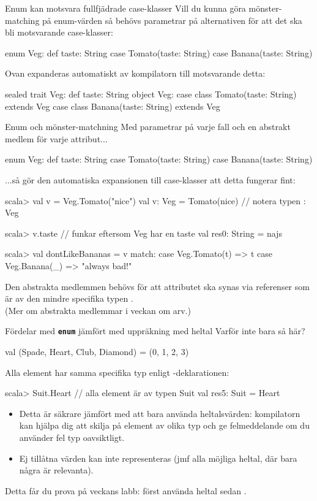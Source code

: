 \begin{Slide}{Enum kan motsvara fullfjädrade case-klasser}
Vill du kunna göra mönster-matching på enum-värden så behövs parametrar på alternativen för att det ska bli motsvarande case-klasser: 
\begin{Code}
enum Veg:
  def taste: String
  case Tomato(taste: String)
  case Banana(taste: String)
\end{Code}
Ovan expanderas automatiskt av kompilatorn till motsvarande detta:
\begin{Code}
sealed trait Veg:
  def taste: String
object Veg:
  case class Tomato(taste: String) extends Veg
  case class Banana(taste: String) extends Veg
\end{Code}
\end{Slide}

\begin{Slide}{Enum och mönster-matchning}
\SlideFontSmall
Med parametrar på varje fall och en abstrakt medlem för varje attribut... 
\begin{Code}
enum Veg:
  def taste: String
  case Tomato(taste: String)
  case Banana(taste: String)
\end{Code}
...så gör den automatiska expansionen till case-klasser att detta fungerar fint: 
\begin{REPLsmall}
scala> val v = Veg.Tomato("nice") 
val v: Veg = Tomato(nice)             // notera typen : Veg

scala> v.taste  // funkar eftersom Veg har en taste
val res0: String = najs

scala> val dontLikeBananas = v match:
           case Veg.Tomato(t) => t 
           case Veg.Banana(_) => "always bad!" 
\end{REPLsmall}
Den abstrakta medlemmen  behövs för att attributet ska synas via referenser som är av den mindre specifika typen .\\(Mer om abstrakta medlemmar i veckan om arv.)

\end{Slide}


\begin{Slide}{Fördelar med \texttt{\textbf{enum}} jämfört med uppräkning med heltal}
Varför inte bara så här?
\begin{Code}
val (Spade, Heart, Club, Diamond) = (0, 1, 2, 3)  
\end{Code}  
Alla element har samma specifika typ enligt -deklarationen:  
\begin{REPL}
scala> Suit.Heart              // alla element är av typen Suit 
val res5: Suit = Heart
\end{REPL}

\begin{itemize}
\item Detta är säkrare jämfört med att bara använda heltalsvärden: kompilatorn kan hjälpa dig att skilja på element av olika typ och ge felmeddelande om du använder fel typ oavsiktligt. 
\item Ej tillåtna värden kan inte representeras (jmf alla möjliga heltal, där bara några är relevanta).
\end{itemize}  
Detta får du prova på veckans labb: först använda heltal sedan .
\end{Slide}
